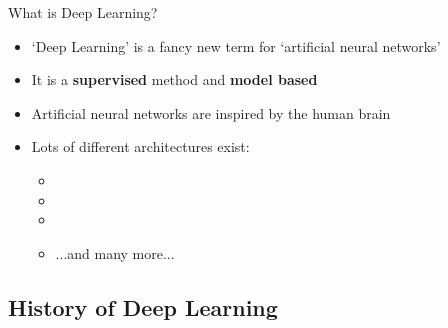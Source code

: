 \begin{frame}{What is Deep Learning?}{}
	\begin{itemize}
		\item `Deep Learning' is a fancy new term for `artificial neural networks' 
		\item It is a \textbf{supervised} method and \textbf{model based}
		\item Artificial neural networks are inspired by the human brain
		\item Lots of different architectures exist:
		\begin{itemize}
			\item {}
			\item {}
			\item {}
			\item ...and many more...
		\end{itemize}
	\end{itemize}
\end{frame}


\subsection{History of Deep Learning}

